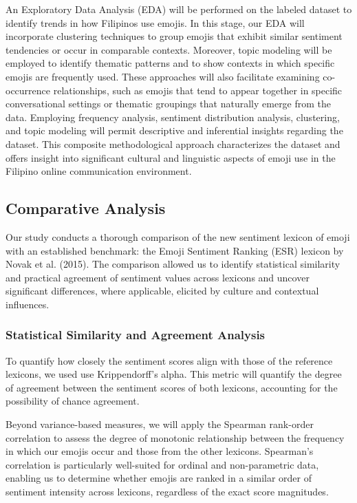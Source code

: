 An Exploratory Data Analysis (EDA) will be performed on the labeled dataset to identify trends in how Filipinos use emojis. In this stage, our EDA will incorporate clustering techniques to group emojis that exhibit similar sentiment tendencies or occur in comparable contexts. Moreover, topic modeling will be employed to identify thematic patterns and to show contexts in which specific emojis are frequently used. These approaches will also facilitate examining co-occurrence relationships, such as emojis that tend to appear together in specific conversational settings or thematic groupings that naturally emerge from the data. Employing frequency analysis, sentiment distribution analysis, clustering, and topic modeling will permit descriptive and inferential insights regarding the dataset. This composite methodological approach characterizes the dataset and offers insight into significant cultural and linguistic aspects of emoji use in the Filipino online communication environment.

\subsection{Comparative Analysis}

Our study conducts a thorough comparison of the new sentiment lexicon of emoji with an established benchmark: the Emoji Sentiment Ranking (ESR) lexicon by Novak et al. (2015). The comparison allowed us to identify statistical similarity and practical agreement of sentiment values across lexicons and uncover significant differences, where applicable, elicited by culture and contextual influences.

\subsubsection{Statistical Similarity and Agreement Analysis}

To quantify how closely the sentiment scores align with those of the reference lexicons, we used use Krippendorff’s alpha. This metric will quantify the degree of agreement between the sentiment scores of both lexicons, accounting for the possibility of chance agreement.

Beyond variance-based measures, we will apply the Spearman rank-order correlation to assess the degree of monotonic relationship between the frequency in which our emojis occur and those from the other lexicons. Spearman's correlation is particularly well-suited for ordinal and non-parametric data, enabling us to determine whether emojis are ranked in a similar order of sentiment intensity across lexicons, regardless of the exact score magnitudes.

